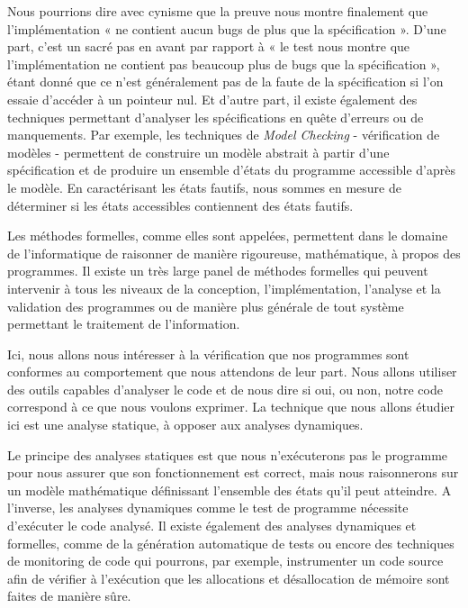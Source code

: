 Nous pourrions dire avec cynisme que la preuve nous montre finalement que 
l'implémentation « ne contient aucun bugs de plus que la spécification ». D'une 
part, c'est un sacré pas en avant par rapport à « le test nous montre que 
l'implémentation ne contient pas beaucoup plus de bugs que la spécification »,
étant donné que ce n'est généralement pas de la faute de la spécification si
l'on essaie d'accéder à un pointeur nul.
Et d'autre part, il existe également des techniques permettant d'analyser les 
spécifications en quête d'erreurs ou de manquements. Par exemple, les techniques
de \textit{Model Checking} - vérification de modèles - permettent de construire un modèle
abstrait à partir d'une spécification et de produire un ensemble d'états du 
programme accessible d'après le modèle. En caractérisant les états fautifs, nous
sommes en mesure de déterminer si les états accessibles contiennent des états
fautifs.





Les méthodes formelles, comme elles sont appelées, permettent dans le domaine de 
l'informatique de raisonner de manière rigoureuse, mathématique, à propos des 
programmes. Il existe un très large panel de méthodes formelles qui peuvent 
intervenir à tous les niveaux de la conception, l'implémentation, l'analyse et
la validation des programmes ou de manière plus générale de tout système
permettant le traitement de l'information.



Ici, nous allons nous intéresser à la vérification que nos programmes sont 
conformes au comportement que nous attendons de leur part. Nous allons utiliser 
des outils capables d'analyser le code et de nous dire si oui, ou non, notre 
code correspond à ce que nous voulons exprimer. La technique que nous allons 
étudier ici est une analyse statique, à opposer aux analyses dynamiques.



Le principe des analyses statiques est que nous n'exécuterons pas le programme 
pour nous assurer que son fonctionnement est correct, mais nous raisonnerons sur 
un modèle mathématique définissant l'ensemble des états qu'il peut atteindre.
A l'inverse, les analyses dynamiques comme le test de programme nécessite 
d'exécuter le code analysé. Il existe également des analyses dynamiques et 
formelles, comme de la génération automatique de tests ou encore des techniques de
monitoring de code qui pourrons, par exemple, instrumenter un code source afin de
vérifier à l'exécution que les allocations et désallocation de mémoire sont faites
de manière sûre.



